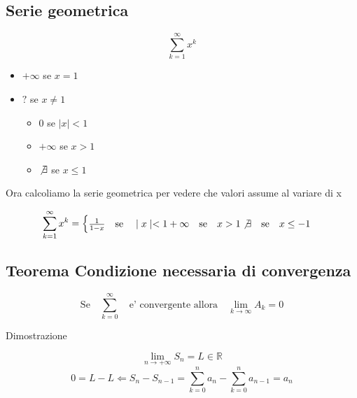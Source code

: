 \documentclass{article}
\begin{document}
          \subsection{Serie geometrica}
          \begin{equation*}
            \sum^{\infty}_{k=1} x^k
          \end{equation*}
          \begin{itemize}
            \item $+\infty$ se $x=1$
            \item $?$ se $x\neq1$
              \begin{itemize}
                \item $0$ se $\mid x \mid <1$
                \item $+\infty$ se $x>1$
                \item $\not \exists$ se $x \leq 1$
              \end{itemize}
          \end{itemize}
          \begin{flushleft}
            Ora calcoliamo la serie geometrica per vedere che valori assume al variare di x
          \end{flushleft}
          \begin{equation*}
            \sum^{\infty}_{k=1} x^k=\begin{cases}
              \frac{1}{1-x} \quad  \text{se} \quad \mid x \mid <1
              +\infty \quad  \text{se} \quad x >1
              \not \exists \quad  \text{se} \quad x \leq -1
            \end{cases}
          \end{equation*}
          \subsection{Teorema Condizione necessaria di convergenza}
          \begin{equation*}
            \text{Se} \quad  \sum^{\infty}_{k=0} \quad \text{e' convergente allora} \quad \lim_{k\to \infty} A_k=0
          \end{equation*}
          \begin{flushleft}
            Dimostrazione
          \end{flushleft}
          \begin{equation*}
            \lim_{n\to +\infty} S_n=L \in \mathbb{R}
          \end{equation*}
          \begin{equation*}
            0=L-L \Leftarrow S_n-S_{n-1}=\sum^n_{k=0} a_n - \sum^n_{k=0} a_{n-1}=a_n
          \end{equation*}
\end{document}
